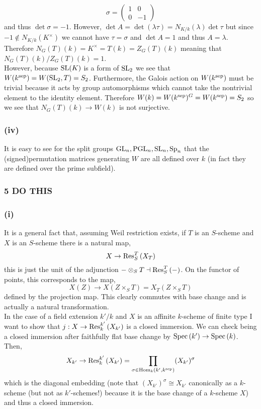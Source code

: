 \documentclass[12pt]{article}
\begin{document}
\[ \sigma = 
\begin{pmatrix}
1 & 0
\\
0 & -1
\end{pmatrix} \]
and thus $\det{\sigma} = -1$. However, $\det{A} = \det{(\lambda \tau)} = N_{K/k}(\lambda) \det{\tau}$ but since $-1 \notin N_{K/k}(K^\times)$ we cannot have $\tau = \sigma$ and $\det{A} = 1$ and thus $A = \lambda$. Therefore $N_G(T)(k) = K^\times = T(k) = Z_G(T)(k)$ meaning that $N_G(T)(k) / Z_G(T)(k) = 1$. 
\bigskip\\
However, because $\mathrm{SL}(K)$ is a form of $\mathrm{SL}_2$ we see that $W(k^{\mathrm{sep}}) = W(\mathrm{SL}_2, T) = S_2$. Furthermore, the Galois action on $W(k^{\mathrm{sep}})$ must be trivial because it acts by group automorphisms which cannot take the nontrivial element to the identity element. Therefore $W(k) = W(k^{\mathrm{sep}})^G = W(k^{\mathrm{sep}}) = S_2$ so we see that $N_G(T)(k) \to W(k)$ is not surjective.

\subsubsection{(iv)}

It is easy to see for the split groups $\mathrm{GL}_n, \mathrm{PGL}_n, \mathrm{SL}_n, \mathrm{Sp}_n$ that the (signed)permutation matrices generating $W$ are all defined over $k$ (in fact they are defined over the prime subfield). 


\renewcommand{\End}[1]{\mathrm{End}\left( #1 \right)}


\subsubsection{5 DO THIS}

\subsubsection{(i)}

It is a general fact that, assuming Weil restriction exists, if $T$ is an $S$-scheme and $X$ is an $S$-scheme there is a natural map,
\[ X \to \mathrm{Res}^{T}_{S} \left( X_T \right) \]
this is just the unit of the adjunction $- \otimes_S T \dashv \mathrm{Res}^{T}_{S} \left( - \right)$. On the functor of points, this corresponds to the map,
\[ X(Z) \to X(Z \times_S T) = X_T(Z \times_S T) \]
defined by the projection map. This clearly commutes with base change and is actually a natural transformation.
\bigskip\\
In the case of a field extension $k' / k$ and $X$ is an affinite $k$-scheme of finite type I want to show that $j : X \to \mathrm{Res}^{k'}_{k} \left( X_{k'} \right)$ is a closed immersion. We can check being a closed immersion after faithfully flat base change by $\mathrm{Spec}\left( k' \right) \to \mathrm{Spec}\left( k \right)$. Then,
\[ X_{k'} \to \mathrm{Res}^{k'}_{k} \left( X_{k'} \right) = \prod_{\sigma \in \mathrm{Hom}_{k} \left( k', k^{\mathrm{sep}} \right)} (X_{k'})^\sigma \]
which is the diagonal embedding (note that $(X_{k'})^\sigma \cong X_{k'}$ canonically as a $k$-scheme (but not as $k'$-schemes!) because  it is the base change of a $k$-scheme $X$) and thus a closed immersion.
\end{document}
